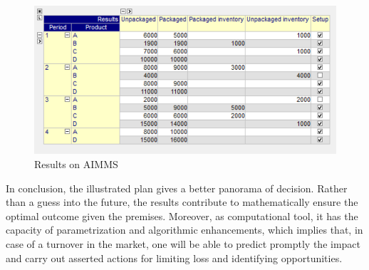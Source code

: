 \documentclass[a4paper,12pt]{article}
\begin{document}
\begin{figure}[H]
\centering
\includegraphics{2.png}
\caption{Results on AIMMS}
\end{figure}

In conclusion, the illustrated plan gives a better panorama of decision. Rather than a guess into the future, the results contribute to mathematically ensure the optimal outcome given the premises. Moreover, as computational tool, it has the capacity of parametrization and algorithmic enhancements, which implies that, in case of a turnover in the market, one will be able to predict promptly the impact and carry out asserted actions for limiting loss and identifying opportunities.

\printbibliography
\end{document}
